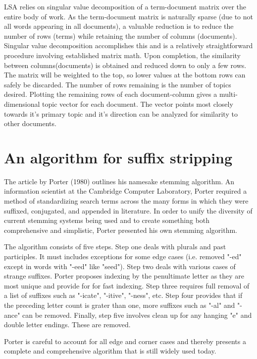\documentclass{article}
\begin{document}
LSA relies on singular value decomposition of a term-document matrix over the entire body of work. As the term-document matrix is naturally sparse (due to not all words appearing in all documents), a valuable reduction is to reduce the number of rows (terms) while retaining the number of columns (documents). Singular value decomposition accomplishes this and is a relatively straightforward procedure involving established matrix math. Upon completion, the similarity between columns(documents) is obtained and reduced down to only a few rows. The matrix will be weighted to the top, so lower values at the bottom rows can safely be discarded. The number of rows remaining is the number of topics desired. Plotting the remaining rows of each document-column gives a multi-dimensional topic vector for each document. The vector points most closely towards it's primary topic and it's direction can be analyzed for similarity to other documents.

\section{An algorithm for suffix stripping}

The article by Porter (1980) \cite{porter1980algorithm} outlines his namesake stemming algorithm. An information scientist at the Cambridge Computer Laboratory, Porter required a method of standardizing search terms across the many forms in which they were suffixed, conjugated, and appended in literature. In order to unify the diversity of current stemming systems being used and to create something both comprehensive and simplistic, Porter presented his own stemming algorithm.

The algorithm consists of five steps. Step one deals with plurals and past participles. It must includes exceptions for some edge cases (i.e. removed "-ed" except in words with "-eed" like "seed"). Step two deals with various cases of strange suffixes. Porter proposes indexing by the penultimate letter as they are most unique and provide for for fast indexing. Step three requires full removal of a list of suffixes such as "-icate", "-itive", "-ness", etc. Step four provides that if the preceding letter count is grater than one, more suffixes such as "-al" and "-ance" can be removed. Finally, step five involves clean up for any hanging "e" and double letter endings. These are removed.

Porter is careful to account for all edge and corner cases and thereby presents a complete and comprehensive algorithm that is still widely used today.

\pagebreak



\end{document}
